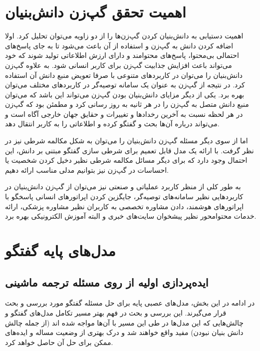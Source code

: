\section{اهمیت تحقق گپ‌زن دانش‌بنیان} \label{chap1:knowledge_importance}

اهمیت دستیابی به دانش‌بنیان کردن گپ‌زن‌ها را از دو زاویه می‌توان تحلیل کرد. اولا اضافه کردن دانش به گپ‌زن و استفاده از آن باعث می‌شود تا به جای پاسخ‌های احتمالی بی‌محتوا، پاسخ‌های محتوامند و دارای ارزش اطلاعاتی تولید شوند که خود می‌تواند باعث افزایش جذابیت گپ‌زن برای کاربر انسانی شود. به علاوه گپ‌زن دانش‌بنیان را می‌توان در کاربردهای متنوعی با صرفا تعویض منبع دانش آن استفاده کرد. در نتیجه از گپ‌زن به عنوان یک سامانه توصیه‌گر در کاربردهای مختلف 
می‌توان بهره برد. یکی از دیگر مزایای دانش‌بنیان بودن گپ‌زن می‌تواند این باشد که می‌توان منبع دانش متصل به گپ‌زن را در هر ثانیه به روز رسانی کرد و مطمئن بود که گپ‌زن در هر لحظه نسبت به آخرین رخدادها و تغییرات و حقایق جهان خارجی آگاه است و می‌تواند درباره آن‌ها بحث و گفتگو کرده و اطلاعاتی را به کاربر انتقال دهد.

اما از سوی دیگر مسئله گپ‌زن دانش‌بنیان را می‌توان به شکل مکالمه شرطی نیز در نظر گرفت. با ارائه یک مدل قابل تعمیم برای شرطی سازی گفتگو مبتنی بر دانش، این احتمال وجود دارد که برای دیگر مسائل مکالمه شرطی نظیر دخیل کردن شخصیت یا احساسات در گپ‌زن نیز بتوانیم مدلی مناسب ارائه دهیم.

به طور  کلی از منظر کاربرد عملیاتی و صنعتی نیز می‌توان از گپ‌زن دانش‌بنیان در کاربرد‌هایی نظیر سامانه‌های توصیه‌گر،
 جایگزین کردن اپراتور‌های انسانی پاسخگو با اپراتور‌های هوشمند، دادن مشاوره تخصصی به کاربران نظیر مشاوره پزشکی، ارائه خدمات محتوامحور نظیر پیشخوان سایت‌های خبری و البته آموزش الکترونیکی بهره برد.  

\section{مدل‌های پایه گفتگو} \label{chap1:history}

\subsection{ایده‌پردازی اولیه از روی مسئله ترجمه ماشینی}

در ادامه در این بخش، مدل‌های  عصبی پایه برای حل مسئله گفتگو مورد بررسی و بحث قرار می‌گیرند. این بررسی و بحث در فهم بهتر مسیر تکامل مدل‌های گفتگو و چالش‌هایی که این مدل‌ها در طی این مسیر با آن‌ها مواجه شده اند (از جمله چالش دانش‌ بنیان نبودن) مفید واقع خواهند شد و درک بهتری از وضعیت مساله و ایده‌های ممکن برای حل آن حاصل خواهد کرد.

